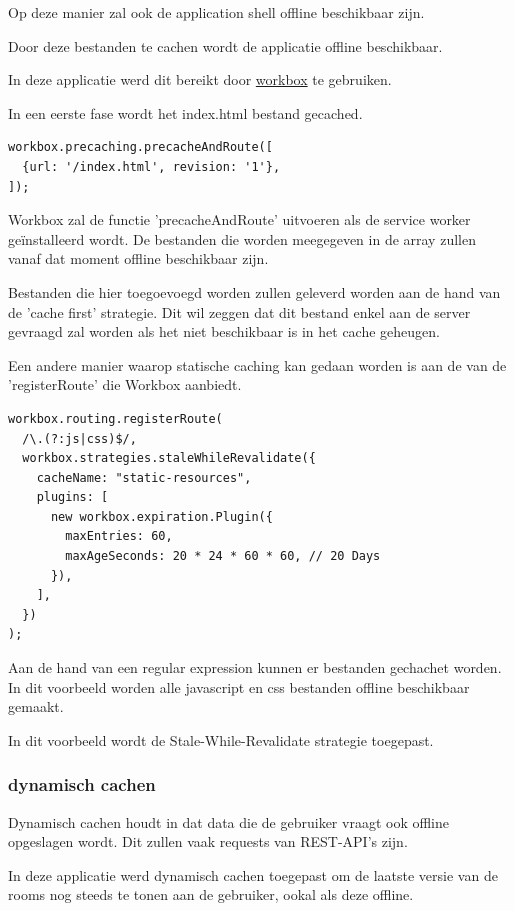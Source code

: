 			Op deze manier zal ook de application shell offline beschikbaar zijn.
			
			Door deze bestanden te cachen wordt de applicatie offline beschikbaar.
			
			In deze applicatie werd dit bereikt door \href{https://developers.google.com/web/tools/workbox}{workbox} te gebruiken.
			
			In een eerste fase wordt het index.html bestand gecached.
\begin{lstlisting}
workbox.precaching.precacheAndRoute([
  {url: '/index.html', revision: '1'},
]);
\end{lstlisting}
		
			Workbox zal de functie 'precacheAndRoute' uitvoeren als de service worker geïnstalleerd wordt. De bestanden die worden meegegeven in de array zullen vanaf dat moment offline beschikbaar zijn.
			\autocite{Workbox2020a}
			
			Bestanden die hier toegoevoegd worden zullen geleverd worden aan de hand van de 'cache first' strategie. Dit wil zeggen dat dit bestand enkel aan de server gevraagd zal worden als het niet beschikbaar is in het cache geheugen.
			
			Een andere manier waarop statische caching kan gedaan worden is aan de van de 'registerRoute' die Workbox aanbiedt. 
			
\begin{lstlisting}
workbox.routing.registerRoute(
  /\.(?:js|css)$/,
  workbox.strategies.staleWhileRevalidate({
    cacheName: "static-resources",
    plugins: [
      new workbox.expiration.Plugin({
        maxEntries: 60,
        maxAgeSeconds: 20 * 24 * 60 * 60, // 20 Days
      }),
    ],
  })
);
\end{lstlisting}
			
			Aan de hand van een regular expression kunnen er bestanden gechachet worden. In dit voorbeeld worden alle javascript en css bestanden offline beschikbaar gemaakt.
			
			In dit voorbeeld wordt de Stale-While-Revalidate strategie toegepast.
			\autocite{Workbox2020b}
			
		\subsubsection{dynamisch cachen}
			Dynamisch cachen houdt in dat data die de gebruiker vraagt ook offline opgeslagen wordt. Dit zullen vaak requests van REST-API's zijn.
			
			In deze applicatie werd dynamisch cachen toegepast om de laatste versie van de rooms nog steeds te tonen aan de gebruiker, ookal als deze offline.
			
